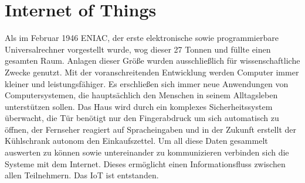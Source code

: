 \chapter{Internet of Things}\label{c:IoT}

Als im Februar 1946 ENIAC, der erste elektronische sowie programmierbare Universalrechner vorgestellt wurde, wog dieser 27 Tonnen und füllte einen gesamten Raum. Anlagen dieser Größe wurden ausschließlich für wissenschaftliche Zwecke genutzt.
Mit der voranschreitenden Entwicklung werden Computer immer kleiner und leistungsfähiger. Es erschließen sich immer neue Anwendungen von Computersystemen, die hauptsächlich den Menschen in seinem Alltagsleben unterstützen sollen.
Das Haus wird durch ein komplexes Sicherheitssystem überwacht, die Tür benötigt nur den Fingerabdruck um sich automatisch zu öffnen, der Fernseher reagiert auf Spracheingaben und in der Zukunft erstellt der Kühlschrank autonom den Einkaufszettel.
Um all diese Daten gesammelt auswerten zu können sowie untereinander zu kommunizieren verbinden sich die Systeme mit dem Internet. Dieses ermöglicht einen Informationsfluss zwischen allen Teilnehmern. 
Das IoT ist entstanden.



